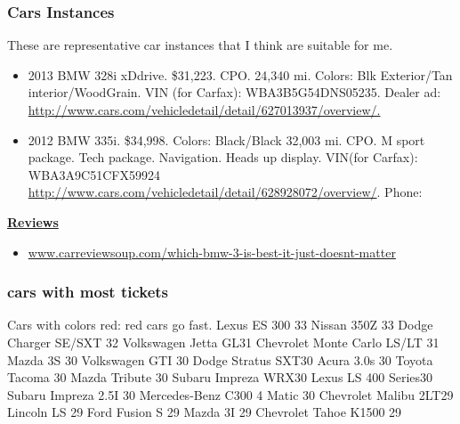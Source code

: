 \begin{frame}
\frametitle{Cars Instances} 
{\tiny These are representative car instances that I think are suitable for me.} 
\begin{itemize} 
\small \item \small  2013 BMW 328i xDdrive. \$31,223. CPO. 24,340
mi. Colors: Blk Exterior/Tan interior/WoodGrain. VIN (for Carfax):
  WBA3B5G54DNS05235. Dealer ad: \url{http://www.cars.com/vehicledetail/detail/627013937/overview/.}
\item \small 2012 BMW 335i. \$34,998. Colors: Black/Black 32,003
  mi. CPO. M sport package. Tech package. Navigation. Heads up display. VIN(for
  Carfax):  WBA3A9C51CFX59924 \url{http://www.cars.com/vehicledetail/detail/628928072/overview/}. Phone: 
\end{itemize} 
\underline{\textbf{ Reviews }} \\
\begin{itemize} 
\small \item \small \url{www.carreviewsoup.com/which-bmw-3-is-best-it-just-doesnt-matter}
\end{itemize} 
\end{frame} 

\begin{frame} 
\frametitle{cars with most tickets} 
Cars with colors red: red cars go fast.  
Lexus ES 300 33
Nissan 350Z 33
Dodge Charger SE/SXT 32
Volkswagen Jetta GL31
Chevrolet Monte Carlo LS/LT 31
Mazda 3S 30
Volkswagen GTI 30
Dodge Stratus SXT30
Acura 3.0s 30
Toyota Tacoma 30
Mazda Tribute 30
Subaru Impreza WRX30
Lexus LS 400 Series30
Subaru Impreza 2.5I 30
Mercedes-Benz C300 4 Matic 30
Chevrolet Malibu 2LT29
Lincoln LS 29
Ford Fusion S 29
Mazda 3I 29
Chevrolet Tahoe K1500 29
\end{frame} 


